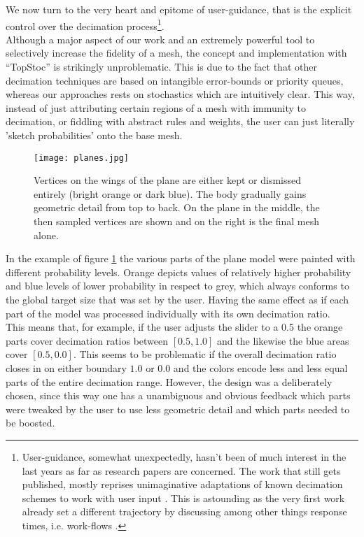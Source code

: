 We now turn to the very heart and epitome of user-guidance, that is the explicit control over the decimation process\footnote{ User-guidance, somewhat unexpectedly, hasn't been of much interest in the last years as far as research papers are concerned. The work that still gets published, mostly reprises unimaginative adaptations of known decimation schemes to work with user input \citep[cf.][]{Ho2006}. This is astounding as the very first work already set a different trajectory by discussing among other things response times, i.e. work-flows \citep[cf.][]{Cignoni1998a}.}.\\
Although a major aspect of our work and an extremely powerful tool to selectively increase the fidelity of a mesh, the concept and implementation with ``TopStoc'' is strikingly unproblematic.
This is due to the fact that other decimation techniques are based on intangible error-bounds or priority queues, whereas our approaches rests on stochastics which are intuitively clear.
This way, instead of just attributing certain regions of a mesh with immunity to decimation, or fiddling with abstract rules and weights, the user can just literally 'sketch probabilities' onto the base mesh.
\begin{figure}[ht]
\centering
\texttt{[image: planes.jpg]}
\caption{Vertices on the wings of the plane are either kept or dismissed entirely (bright orange or dark blue). The body gradually gains geometric detail from top to back. On the plane in the middle, the then sampled vertices are shown and on the right is the final mesh alone.}
\label{fig:planes}
\end{figure}
In the example of figure \ref{fig:planes} the various parts of the plane model were painted with different probability levels.
Orange depicts values of relatively higher probability and blue levels of lower probability in respect to grey, which always conforms to the global target size that was set by the user.
Having the same effect as if each part of the model was processed individually with its own decimation ratio.\\  
This means that, for example, if the user adjusts the slider to a 0.5 the orange parts cover decimation ratios between $[0.5,1.0]$ and the likewise the blue areas cover $[0.5,0.0]$.
This seems to be problematic if the overall decimation ratio closes in on either boundary $1.0$ or $0.0$ and the colors encode less and less equal parts of the entire decimation range.
However, the design was a deliberately chosen, since this way one has a unambiguous and obvious feedback which parts were tweaked by the user to use less geometric detail and which parts needed to be boosted.
